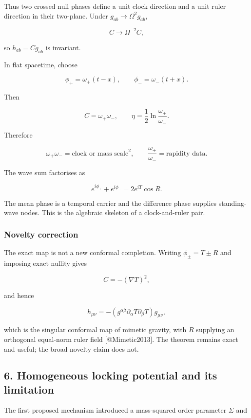 \documentclass[
]{article}
\begin{document}
Thus two crossed null phases define a unit clock direction and a unit
ruler direction in their two-plane. Under
\(g_{ab}\rightarrow\Omega^2g_{ab}\),

\[
C\rightarrow\Omega^{-2}C,
\]

so \(h_{ab}=Cg_{ab}\) is invariant.

In flat spacetime, choose

\[
\phi_+=\omega_+(t-x),
\qquad
\phi_-=\omega_-(t+x).
\]

Then

\[
C=\omega_+\omega_-,
\qquad
\eta=\frac12\ln\frac{\omega_+}{\omega_-}.
\]

Therefore

\[
\boxed{
\omega_+\omega_- = \text{clock or mass scale}^{2},
\qquad
\frac{\omega_+}{\omega_-}=\text{rapidity data}.
}
\]

The wave sum factorises as

\[
e^{i\phi_+}+e^{i\phi_-}=2e^{iT}\cos R.
\]

The mean phase is a temporal carrier and the difference phase supplies
standing-wave nodes. This is the algebraic skeleton of a clock-and-ruler
pair.

\hypertarget{novelty-correction}{%
\subsubsection{Novelty correction}\label{novelty-correction}}

The exact map is not a new conformal completion. Writing
\(\phi_\pm=T\pm R\) and imposing exact nullity gives

\[
C=-(\nabla T)^2,
\]

and hence

\[
h_{\mu\nu}=-(g^{\alpha\beta}\partial_\alpha T\partial_\beta T)g_{\mu\nu},
\]

which is the singular conformal map of mimetic gravity, with \(R\)
supplying an orthogonal equal-norm ruler field {[}@Mimetic2013{]}. The
theorem remains exact and useful; the broad novelty claim does not.

\hypertarget{homogeneous-locking-potential-and-its-limitation}{%
\subsection{6. Homogeneous locking potential and its
limitation}\label{homogeneous-locking-potential-and-its-limitation}}

The first proposed mechanism introduced a mass-squared order parameter
\(\Sigma\) and
\end{document}
